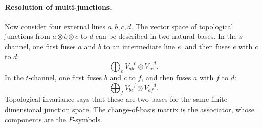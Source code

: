 \documentclass[11pt]{article}
\begin{document}
\paragraph{Resolution of multi-junctions.}
Now consider four external lines $a,b,c,d$.  The vector space of topological junctions from $a\otimes b\otimes c$ to $d$ can be described in two natural bases.  In the $s$-channel, one first fuses $a$ and $b$ to an intermediate line $e$, and then fuses $e$ with $c$ to $d$:
\begin{equation}
  \bigoplus_e V_{ab}^{\phantom{ab}e}\otimes V_{ec}^{\phantom{ec}d} .
  \label{eq:leftjunctionresolution}
\end{equation}
In the $t$-channel, one first fuses $b$ and $c$ to $f$, and then fuses $a$ with $f$ to $d$:
\begin{equation}
  \bigoplus_f V_{bc}^{\phantom{bc}f}\otimes V_{af}^{\phantom{af}d} .
  \label{eq:rightjunctionresolution}
\end{equation}
Topological invariance says that these are two bases for the same finite-dimensional junction space.  The change-of-basis matrix is the associator, whose components are the $F$-symbols.
\end{document}
